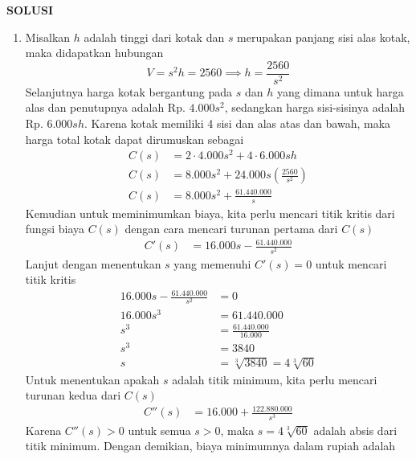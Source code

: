 \documentclass[11pt,openany,a4paper]{article}
\renewcommand{\headrulewidth}{0pt}
\begin{document}
    \newpage
    \fancyfoot{}
    {\centering\textbf{SOLUSI}}
    \renewcommand{\arraystretch}{1.5}
    \renewcommand{\headrulewidth}{1pt}
    \begin{enumerate}
        \item Misalkan $h$ adalah tinggi dari kotak dan $s$ merupakan panjang sisi alas kotak, maka didapatkan hubungan
        \[
            V = s^2 h = 2560 \implies h = \frac{2560}{s^2}
        \]
        Selanjutnya harga kotak bergantung pada $s$ dan $h$ yang dimana untuk harga alas dan penutupnya adalah Rp. \(4.000s^2\), sedangkan harga sisi-sisinya adalah Rp. \(6.000sh\). Karena kotak memiliki 4 sisi dan alas atas dan bawah, maka harga total kotak dapat dirumuskan sebagai
        \begin{align*}
            C(s) &= 2\cdot 4.000s^2 + 4\cdot 6.000sh \\
            C(s) &= 8.000s^2 + 24.000s\left(\frac{2560}{s^2}\right) \\
            C(s) &= 8.000s^2 + \frac{61.440.000}{s} 
        \end{align*}
        Kemudian untuk meminimumkan biaya, kita perlu mencari titik kritis dari fungsi biaya $C(s)$ dengan cara mencari turunan pertama dari $C(s)$
        \begin{align*}
            C'(s) &= 16.000s - \frac{61.440.000}{s^2} 
        \end{align*}
        Lanjut dengan menentukan $s$ yang memenuhi $C'(s) = 0$ untuk mencari titik kritis
        \begin{align*}
            16.000s - \frac{61.440.000}{s^2} &= 0 \\
            16.000s^3 &= 61.440.000 \\
            s^3 &= \frac{61.440.000}{16.000} \\
            s^3 &= 3840 \\
            s &= \sqrt[3]{3840}=4\sqrt[3]{60}
        \end{align*}
        Untuk menentukan apakah $s$ adalah titik minimum, kita perlu mencari turunan kedua dari $C(s)$
        \begin{align*}
            C''(s) &= 16.000 + \frac{122.880.000}{s^3}
        \end{align*}
        Karena $C''(s) > 0$ untuk semua $s > 0$, maka $s=4\sqrt[3]{60}$ adalah absis dari titik minimum. Dengan demikian, biaya minimumnya dalam rupiah adalah

\end{enumerate}
\end{document}

